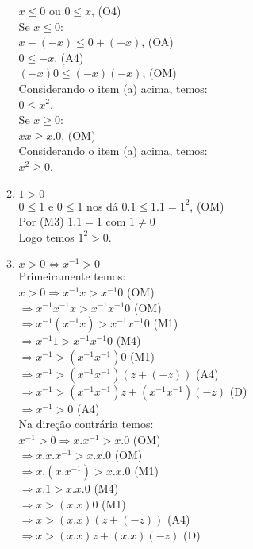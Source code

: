 \documentclass[10pt]{book}
\begin{document}
\begin{enumerate}
\begin{enumerate}
			$x \leq 0$ ou $0 \leq x$, (O4)\\
			Se $x \leq 0$:\\
			$x - (-x) \leq 0 + (-x)$, (OA)\\
			$0 \leq -x$, (A4)\\
			$(-x)0 \leq (-x)(-x)$, (OM)\\
			Considerando o item (a) acima, temos:\\
			$0 \leq x^2$.\\
			Se $x \geq 0$:\\
			$xx \geq x.0$, (OM)\\
			Considerando o item (a) acima, temos:\\
			$x^2 \geq 0$.			
			\item %
			$1 > 0$\\
			$0 \leq 1$ e $0 \leq 1$ nos dá $0.1 \leq 1.1 = 1^2$, (OM)\\
			Por (M3) $1.1 = 1$ com $1 \neq 0$\\
			Logo temos $1^2 > 0$.
			\item %
			$x > 0 \Leftrightarrow x^{-1} > 0$\\
			Primeiramente temos:\\
			$x > 0 \Rightarrow x^{-1}x > x^{-1}0 $ (OM)\\
			$\Rightarrow x^{-1}x^{-1}x > x^{-1}x^{-1}0$ (OM)\\
			$\Rightarrow x^{-1}(x^{-1}x) > x^{-1}x^{-1}0$ (M1)\\
			$\Rightarrow x^{-1}1 >x^{-1}x^{-1}0$ (M4)\\
			$\Rightarrow x^{-1} > (x^{-1}x^{-1})0$ (M1)\\
			$\Rightarrow x^{-1} > (x^{-1}x^{-1})(z+(-z))$ (A4)\\
			$\Rightarrow x^{-1} > (x^{-1}x^{-1})z + (x^{-1}x^{-1})(-z)$ (D)\\
			$\Rightarrow x^{-1} > 0$  (A4)\\
			Na direção contrária temos:\\
			$x^{-1} > 0 \Rightarrow x.x^{-1} > x.0 $ (OM)\\
			$\Rightarrow x.x.x^{-1} > x.x.0$ (OM)\\
			$\Rightarrow x.(x.x^{-1}) > x.x.0$ (M1)\\
			$\Rightarrow x.1 >x.x.0$ (M4)\\
			$\Rightarrow x > (x.x)0$ (M1)\\
			$\Rightarrow x > (x.x)(z+(-z))$ (A4)\\
			$\Rightarrow x > (x.x)z + (x.x)(-z)$ (D)\\

\end{enumerate}
\end{enumerate}
\end{document}
